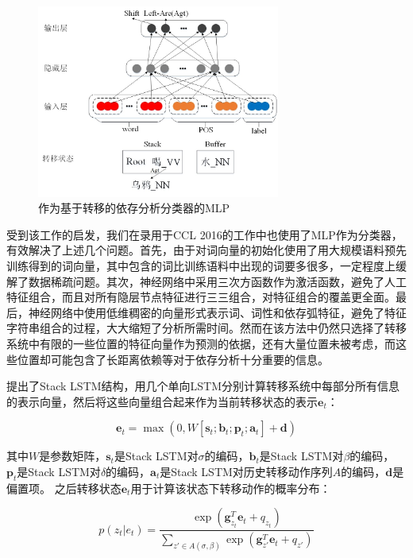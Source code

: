 \begin{figure}[hbtp]
	\centering
	\includegraphics[width=80mm]{picture/chen2014mlp.jpg}
	\caption{作为基于转移的依存分析分类器的MLP}
	\label{fig:chen2014mlp}
\end{figure}

受到该工作的启发，我们在录用于CCL 2016的工作中也使用了MLP作为分类器，有效解决了上述几个问题。首先，由于对词向量的初始化使用了用大规模语料预先训练得到的词向量，其中包含的词比训练语料中出现的词要多很多，一定程度上缓解了数据稀疏问题。其次，神经网络中采用三次方函数作为激活函数，避免了人工特征组合，而且对所有隐层节点特征进行三三组合，对特征组合的覆盖更全面。最后，神经网络中使用低维稠密的向量形式表示词、词性和依存弧特征，避免了特征字符串组合的过程，大大缩短了分析所需时间。然而在该方法中仍然只选择了转移系统中有限的一些位置的特征向量作为预测的依据，还有大量位置未被考虑，而这些位置却可能包含了长距离依赖等对于依存分析十分重要的信息。

提出了Stack LSTM结构，用几个单向LSTM分别计算转移系统中每部分所有信息的表示向量，然后将这些向量组合起来作为当前转移状态的表示$\mathbf{e}_t$：

\vspace{-0.6em}
\begin{equation}
\label{eq:trans}
\mathbf{e}_t=\max(0,W[\mathbf{s}_t;\mathbf{b}_t; \mathbf{p}_t; \mathbf{a}_t ]+\mathbf{d})
\end{equation}

其中$W$是参数矩阵，$\mathbf{s}_t$是Stack LSTM对$\sigma$的编码，$\mathbf{b}_t$是Stack LSTM对$\beta$的编码， $\mathbf{p}_t$是Stack LSTM对$\delta$的编码，$\mathbf{a}_t$是Stack LSTM对历史转移动作序列$A$的编码，$\mathbf{d}$是偏置项。
之后转移状态$\mathbf{e}_t$用于计算该状态下转移动作的概率分布：

\vspace{-0.6em}
\begin{equation}
\label{eq:trans-softmax}
p(z_t|e_t)=\frac{\exp(\mathbf{g}^T_{z_t}\mathbf{e}_t + q_{z_t})}{\sum_{z'\in A(\sigma, \beta)}\exp (\mathbf{g}^T_{z'}\mathbf{e}_t+q_{z'})}
\end{equation}

